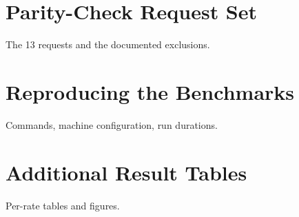 \documentclass{rptuma}
\begin{document}
\chapter{Parity-Check Request Set}
The 13 requests and the documented exclusions.
\chapter{Reproducing the Benchmarks}
Commands, machine configuration, run durations.
\chapter{Additional Result Tables}
Per-rate tables and figures.



\end{document}
